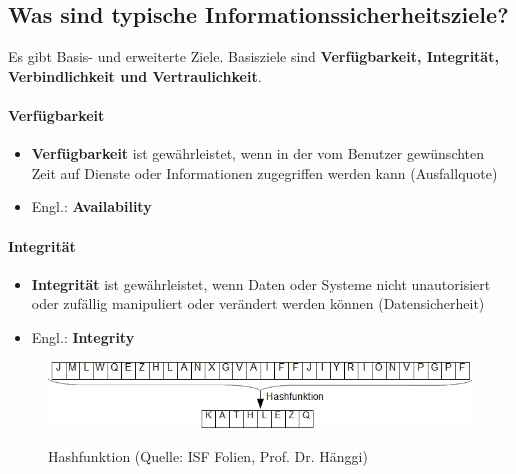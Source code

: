 \subsection*{Was sind typische Informationssicherheitsziele?}\label{sub:Informationssicherheitsziele}
Es gibt Basis- und erweiterte Ziele. Basisziele sind \textbf{Verfügbarkeit, Integrität, Verbindlichkeit und Vertraulichkeit}.
\paragraph*{Verfügbarkeit}\label{par:Availability}
\begin{itemize}
    \item \textbf{Verfügbarkeit} ist gewährleistet, wenn in der vom Benutzer gewünschten Zeit auf Dienste oder Informationen zugegriffen werden kann (Ausfallquote)
    \item Engl.: \textbf{Availability}
\end{itemize}

\paragraph*{Integrität}\label{par:Integrity}
\begin{itemize}
    \item \textbf{Integrität} ist gewährleistet, wenn Daten oder Systeme nicht unautorisiert oder zufällig manipuliert oder verändert werden können (Datensicherheit)
    \item Engl.: \textbf{Integrity}
\end{itemize}
\begin{figure}[H]
    \begin{center}
    \label{pic:Hash}
    \includegraphics[width=\textwidth]{images/hash.png}
    \caption{Hashfunktion (Quelle: ISF Folien, Prof. Dr. Hänggi)}
    \end{center}
\end{figure}

\pagebreak
